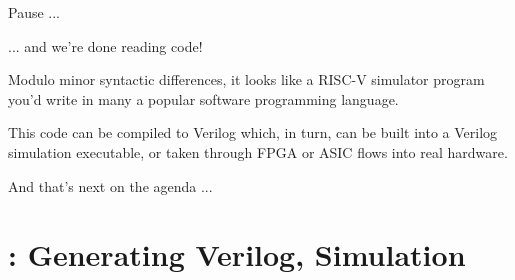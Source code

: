 \begin{frame}[fragile]

\begin{center}
  {\LARGE Pause ...}

 \vspace*{8ex}

 \begin{minipage}{0.8\textwidth}

   ... and we're done reading {\DRUM} code!

   \vspace*{2ex}

   {\scriptsize Modulo minor syntactic differences, it looks like a RISC-V
   simulator program you'd write in many a popular software
   programming language.}

   \vspace*{10ex}

   This code can be compiled to Verilog which, in turn, can be built
   into a Verilog simulation executable, or taken through FPGA or ASIC
   flows into real hardware.

 \end{minipage}

 \vspace*{5ex}

 And that's next on the agenda ...

\end{center}

\end{frame}


\section{{\DRUM}: Generating Verilog, Simulation}

\label{sec_Drum_simulation}

